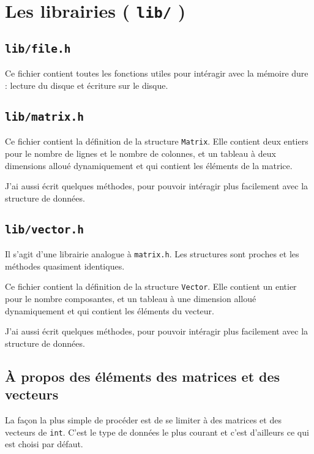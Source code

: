 \documentclass[a4paper,10pt]{article}
\begin{document}
\section{Les librairies ( \texttt{lib/} )}

\subsection{\texttt{lib/file.h}}

Ce fichier contient toutes les fonctions utiles pour intéragir avec la mémoire dure : lecture du disque et écriture sur le disque.

\subsection{\texttt{lib/matrix.h}}

Ce fichier contient la définition de la structure \texttt{Matrix}. Elle contient deux entiers pour le nombre de lignes et le nombre de colonnes, et un tableau à deux dimensions alloué dynamiquement et qui contient les éléments de la matrice. 

J'ai aussi écrit quelques méthodes, pour pouvoir intéragir plus facilement avec la structure de données.

\vspace{1cm}

\subsection{\texttt{lib/vector.h}}

Il s'agit d'une librairie analogue à \texttt{matrix.h}. Les structures sont proches et les méthodes quasiment identiques.

\bigskip

Ce fichier contient la définition de la structure \texttt{Vector}. Elle contient un entier pour le nombre composantes, et un tableau à une dimension alloué dynamiquement et qui contient les éléments du vecteur. 

J'ai aussi écrit quelques méthodes, pour pouvoir intéragir plus facilement avec la structure de données.

\subsection{À propos des éléments des matrices et des vecteurs}

La façon la plus simple de procéder est de se limiter à des matrices et des vecteurs de \texttt{int}. C'est le type de données le plus courant et c'est d'ailleurs ce qui est choisi par défaut.
\end{document}
